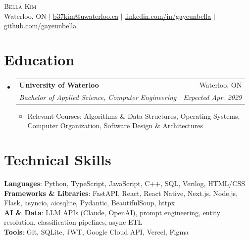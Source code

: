 \documentclass[letterpaper,11pt]{article}
\makeatletter
\newcommand{\resumeItem}[1]{\item\small{{#1 \vspace{-2pt}}}}
\newcommand{\resumeSubheading}[4]{
  \vspace{-2pt}\item
    \begin{tabular*}{0.97\textwidth}[t]{l@{\extracolsep{\fill}}r}
      \textbf{#1} & #2 \\
      \textit{\small#3} & \textit{\small #4} \\
    \end{tabular*}\vspace{-7pt}
}
\newcommand{\resumeSubHeadingListStart}{\begin{itemize}[leftmargin=0.15in, label={}]}
\newcommand{\resumeSubHeadingListEnd}{\end{itemize}}
\newcommand{\resumeItemListStart}{\begin{itemize}}
\newcommand{\resumeItemListEnd}{\end{itemize}\vspace{-5pt}}
\makeatother
\begin{document}
\begin{center}
  {\Huge \scshape Bella Kim} \\ \vspace{4pt}
  \small
  Waterloo, ON \;$|$\;
  \href{mailto:b37kim@uwaterloo.ca}{b37kim@uwaterloo.ca} \;$|$\;
  \href{https://www.linkedin.com/in/gayeunbella/}{linkedin.com/in/gayeunbella} \;$|$\;
  \href{https://github.com/gayeunbella}{github.com/gayeunbella}
\end{center}

\section{Education}
  \resumeSubHeadingListStart
    \resumeSubheading
      {University of Waterloo}{Waterloo, ON}
      {Bachelor of Applied Science, Computer Engineering}{Expected Apr. 2029}
      \resumeItemListStart
        \resumeItem{Relevant Courses: Algorithms \& Data Structures, Operating Systems, Computer Organization, Software Design \& Architectures}
      \resumeItemListEnd
  \resumeSubHeadingListEnd

\section{Technical Skills}
  \begin{itemize}[leftmargin=0.15in, label={}]
    \small{\item{
      \textbf{Languages}{: Python, TypeScript, JavaScript, C++, SQL, Verilog, HTML/CSS} \\
      \textbf{Frameworks \& Libraries}{: FastAPI, React, React Native, Next.js, Node.js, Flask, asyncio, aiosqlite, Pydantic, BeautifulSoup, httpx} \\
      \textbf{AI \& Data}{: LLM APIs (Claude, OpenAI), prompt engineering, entity resolution, classification pipelines, async ETL} \\
      \textbf{Tools}{: Git, SQLite, JWT, Google Cloud API, Vercel, Figma}
    }}
  \end{itemize}

\end{document}
